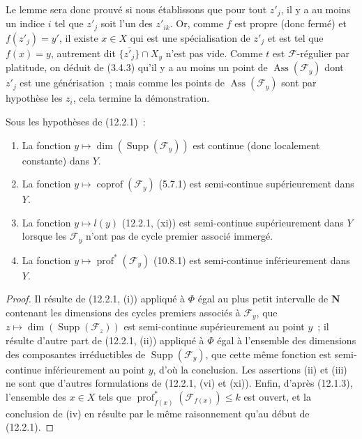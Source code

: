 \begin{env}[12.2.1.3]
Le lemme sera donc prouvé si nous établissons que pour tout $z'_j$, il y a au
moins un indice $i$ tel que $z'_j$ soit l'un des $z'_{ik}$. Or, comme $f$ est
propre (donc fermé) et $f(z'_j)=y'$, il existe $x\in X$ qui est une
spécialisation de $z'_j$ et est tel que $f(x)=y$, autrement dit
$\overline{\{z'_j\}}\cap X_y$ n'est pas vide. Comme $t$ est
$\mathcal F$-régulier par platitude, on déduit de (3.4.3) qu'il y a au moins un
point de $\operatorname{Ass}(\mathcal F_y)$ dont $z'_j$ est une
générisation~; mais comme les points de $\operatorname{Ass}(\mathcal F_y)$
sont par hypothèse les $z_i$, cela termine la démonstration.
\end{env}

\begin{corollary}[12.2.2]
\label{IV.12.2.2-fr}
Sous les hypothèses de (12.2.1)~:
\begin{enumerate}[label=(\roman*)]
  \item La fonction $y\mapsto\dim(\operatorname{Supp}(\mathcal F_y))$ est
  continue (donc localement constante) dans $Y$.
  \item La fonction $y\mapsto\operatorname{coprof}(\mathcal F_y)$ (5.7.1) est
  semi-continue supérieurement dans $Y$.
  \item La fonction $y\mapsto l(y)$ (12.2.1, (xi)) est semi-continue
  supérieurement dans $Y$ lorsque les $\mathcal F_y$ n'ont pas de cycle
  premier associé immergé.
  \item La fonction $y\mapsto\operatorname{prof}^{*}(\mathcal F_y)$ (10.8.1)
  est semi-continue inférieurement dans $Y$.
\end{enumerate}
\end{corollary}

\begin{proof}
Il résulte de (12.2.1, (i)) appliqué à $\Phi$ égal au plus petit intervalle de
$\mathbf N$ contenant les dimensions des cycles premiers associés à
$\mathcal F_y$, que $z\mapsto\dim(\operatorname{Supp}(\mathcal F_z))$ est
semi-continue supérieurement au point $y$~; il résulte d'autre part de
(12.2.1, (ii)) appliqué à $\Phi$ égal à l'ensemble des dimensions des
composantes irréductibles de $\operatorname{Supp}(\mathcal F_y)$, que cette
même fonction est semi-continue inférieurement au point $y$, d'où la
conclusion. Les assertions (ii) et (iii) ne sont que d'autres formulations de
(12.2.1, (vi) et (xi)). Enfin, d'après (12.1.3), l'ensemble des $x\in X$ tels
que $\operatorname{prof}^{*}_{f(x)}(\mathcal F_{f(x)})\leq k$ est ouvert, et la
conclusion de (iv) en résulte par le même raisonnement qu'au début de (12.2.1).
\end{proof}

